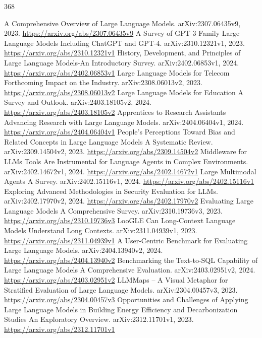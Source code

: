 \documentclass[11pt]{article}
\begin{document}
\begin{thebibliography}{368}
 A Comprehensive Overview of Large Language Models. arXiv:2307.06435v9, 2023. \url{https://arxiv.org/abs/2307.06435v9}
 A Survey of GPT-3 Family Large Language Models Including ChatGPT and GPT-4. arXiv:2310.12321v1, 2023. \url{https://arxiv.org/abs/2310.12321v1}
 History, Development, and Principles of Large Language Models-An Introductory Survey. arXiv:2402.06853v1, 2024. \url{https://arxiv.org/abs/2402.06853v1}
 Large Language Models for Telecom Forthcoming Impact on the Industry. arXiv:2308.06013v2, 2023. \url{https://arxiv.org/abs/2308.06013v2}
 Large Language Models for Education A Survey and Outlook. arXiv:2403.18105v2, 2024. \url{https://arxiv.org/abs/2403.18105v2}
 Apprentices to Research Assistants Advancing Research with Large Language Models. arXiv:2404.06404v1, 2024. \url{https://arxiv.org/abs/2404.06404v1}
 People's Perceptions Toward Bias and Related Concepts in Large Language Models A Systematic Review. arXiv:2309.14504v2, 2023. \url{https://arxiv.org/abs/2309.14504v2}
 Middleware for LLMs Tools Are Instrumental for Language Agents in Complex Environments. arXiv:2402.14672v1, 2024. \url{https://arxiv.org/abs/2402.14672v1}
 Large Multimodal Agents A Survey. arXiv:2402.15116v1, 2024. \url{https://arxiv.org/abs/2402.15116v1}
 Exploring Advanced Methodologies in Security Evaluation for LLMs. arXiv:2402.17970v2, 2024. \url{https://arxiv.org/abs/2402.17970v2}
 Evaluating Large Language Models A Comprehensive Survey. arXiv:2310.19736v3, 2023. \url{https://arxiv.org/abs/2310.19736v3}
 LooGLE Can Long-Context Language Models Understand Long Contexts. arXiv:2311.04939v1, 2023. \url{https://arxiv.org/abs/2311.04939v1}
 A User-Centric Benchmark for Evaluating Large Language Models. arXiv:2404.13940v2, 2024. \url{https://arxiv.org/abs/2404.13940v2}
 Benchmarking the Text-to-SQL Capability of Large Language Models A Comprehensive Evaluation. arXiv:2403.02951v2, 2024. \url{https://arxiv.org/abs/2403.02951v2}
 LLMMaps -- A Visual Metaphor for Stratified Evaluation of Large Language Models. arXiv:2304.00457v3, 2023. \url{https://arxiv.org/abs/2304.00457v3}
 Opportunities and Challenges of Applying Large Language Models in Building Energy Efficiency and Decarbonization Studies An Exploratory Overview. arXiv:2312.11701v1, 2023. \url{https://arxiv.org/abs/2312.11701v1}

\end{thebibliography}
\end{document}
